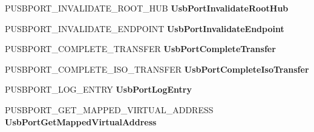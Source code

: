 \begin{DoxyCompactItemize}
\item 
\mbox{\label{struct___u_s_b_p_o_r_t___r_e_g_i_s_t_r_a_t_i_o_n___p_a_c_k_e_t_a9fad701e5b6a14fed7ce0f39420a560d}} 
P\+U\+S\+B\+P\+O\+R\+T\+\_\+\+I\+N\+V\+A\+L\+I\+D\+A\+T\+E\+\_\+\+R\+O\+O\+T\+\_\+\+H\+UB {\bfseries Usb\+Port\+Invalidate\+Root\+Hub}
\item 
\mbox{\label{struct___u_s_b_p_o_r_t___r_e_g_i_s_t_r_a_t_i_o_n___p_a_c_k_e_t_aec7427f202cac5c265564422a6510a5e}} 
P\+U\+S\+B\+P\+O\+R\+T\+\_\+\+I\+N\+V\+A\+L\+I\+D\+A\+T\+E\+\_\+\+E\+N\+D\+P\+O\+I\+NT {\bfseries Usb\+Port\+Invalidate\+Endpoint}
\item 
\mbox{\label{struct___u_s_b_p_o_r_t___r_e_g_i_s_t_r_a_t_i_o_n___p_a_c_k_e_t_ad2c5b41316df5c5dcf3b94ab54951cb3}} 
P\+U\+S\+B\+P\+O\+R\+T\+\_\+\+C\+O\+M\+P\+L\+E\+T\+E\+\_\+\+T\+R\+A\+N\+S\+F\+ER {\bfseries Usb\+Port\+Complete\+Transfer}
\item 
\mbox{\label{struct___u_s_b_p_o_r_t___r_e_g_i_s_t_r_a_t_i_o_n___p_a_c_k_e_t_ab5236859759bff6743a5c7e9d45bd0e0}} 
P\+U\+S\+B\+P\+O\+R\+T\+\_\+\+C\+O\+M\+P\+L\+E\+T\+E\+\_\+\+I\+S\+O\+\_\+\+T\+R\+A\+N\+S\+F\+ER {\bfseries Usb\+Port\+Complete\+Iso\+Transfer}
\item 
\mbox{\label{struct___u_s_b_p_o_r_t___r_e_g_i_s_t_r_a_t_i_o_n___p_a_c_k_e_t_a68042b6da31271b2ab4783d933a804c9}} 
P\+U\+S\+B\+P\+O\+R\+T\+\_\+\+L\+O\+G\+\_\+\+E\+N\+T\+RY {\bfseries Usb\+Port\+Log\+Entry}
\item 
\mbox{\label{struct___u_s_b_p_o_r_t___r_e_g_i_s_t_r_a_t_i_o_n___p_a_c_k_e_t_aebd9c0cf657f77b720fc8f30e119f142}} 
P\+U\+S\+B\+P\+O\+R\+T\+\_\+\+G\+E\+T\+\_\+\+M\+A\+P\+P\+E\+D\+\_\+\+V\+I\+R\+T\+U\+A\+L\+\_\+\+A\+D\+D\+R\+E\+SS {\bfseries Usb\+Port\+Get\+Mapped\+Virtual\+Address}
\item 
\mbox{\label{struct___u_s_b_p_o_r_t___r_e_g_i_s_t_r_a_t_i_o_n___p_a_c_k_e_t_a2f4e5842bee4902fcff3a3529e7bd98f}} 

\end{DoxyCompactItemize}
